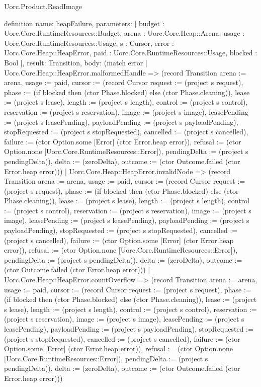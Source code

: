 \begin{lexlean}{Uorc.Product.ReadImage}
\begin{semanticmodule}
definition{
  name: heapFailure,
  parameters: [
    budget : Uorc.Core.RuntimeResources::Budget,
    arena : Uorc.Core.Heap::Arena,
    usage : Uorc.Core.RuntimeResources::Usage,
    s : Cursor,
    error : Uorc.Core.Heap::HeapError,
    paid : Uorc.Core.RuntimeResources::Usage,
    blocked : Bool
  ],
  result: Transition,
  body: (match error
    | Uorc.Core.Heap::HeapError.malformedHandle => (record Transition {arena := arena, usage := paid, cursor := (record Cursor {request := (project s request), phase := (if blocked then (ctor Phase.blocked) else (ctor Phase.cleaning)), lease := (project s lease), length := (project s length), control := (project s control), reservation := (project s reservation), image := (project s image), leasePending := (project s leasePending), payloadPending := (project s payloadPending), stopRequested := (project s stopRequested), cancelled := (project s cancelled), failure := (ctor Option.some [Error] (ctor Error.heap error)), refusal := (ctor Option.none [Uorc.Core.RuntimeResources::Error]), pendingDelta := (project s pendingDelta)}), delta := (zeroDelta), outcome := (ctor Outcome.failed (ctor Error.heap error))})
    | Uorc.Core.Heap::HeapError.invalidNode => (record Transition {arena := arena, usage := paid, cursor := (record Cursor {request := (project s request), phase := (if blocked then (ctor Phase.blocked) else (ctor Phase.cleaning)), lease := (project s lease), length := (project s length), control := (project s control), reservation := (project s reservation), image := (project s image), leasePending := (project s leasePending), payloadPending := (project s payloadPending), stopRequested := (project s stopRequested), cancelled := (project s cancelled), failure := (ctor Option.some [Error] (ctor Error.heap error)), refusal := (ctor Option.none [Uorc.Core.RuntimeResources::Error]), pendingDelta := (project s pendingDelta)}), delta := (zeroDelta), outcome := (ctor Outcome.failed (ctor Error.heap error))})
    | Uorc.Core.Heap::HeapError.countOverflow => (record Transition {arena := arena, usage := paid, cursor := (record Cursor {request := (project s request), phase := (if blocked then (ctor Phase.blocked) else (ctor Phase.cleaning)), lease := (project s lease), length := (project s length), control := (project s control), reservation := (project s reservation), image := (project s image), leasePending := (project s leasePending), payloadPending := (project s payloadPending), stopRequested := (project s stopRequested), cancelled := (project s cancelled), failure := (ctor Option.some [Error] (ctor Error.heap error)), refusal := (ctor Option.none [Uorc.Core.RuntimeResources::Error]), pendingDelta := (project s pendingDelta)}), delta := (zeroDelta), outcome := (ctor Outcome.failed (ctor Error.heap error))})
}
\end{semanticmodule}
\end{lexlean}
